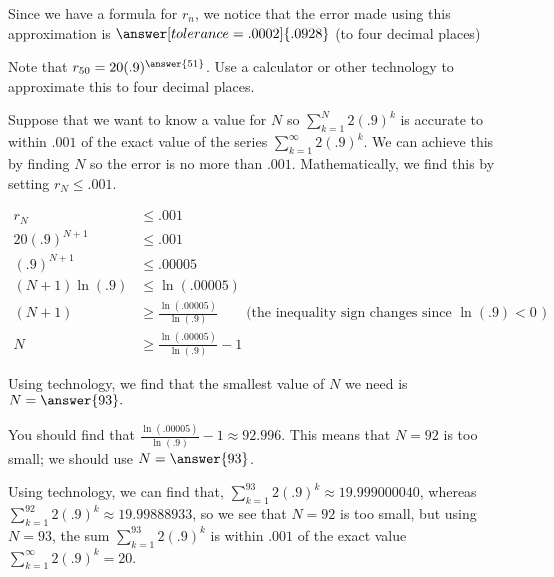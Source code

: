 \documentclass{ximera}
\begin{document}
\begin{exercise}
\begin{exercise}
\begin{exercise}
Since we have a formula for $r_n$, we notice that the error made using this approximation is $\answer[tolerance=.0002]{.0928}$ (to four decimal places)

\begin{hint}
Note that $r_{50} = 20(.9)^{\answer{51}}$.  Use a calculator or other technology to approximate this to four decimal places.
\end{hint}

\end{exercise}
\begin{exercise}
Suppose that we want to know a value for $N$ so $\sum_{k=1}^{N} 2(.9)^k $ is accurate to within $.001$ of the exact value of the series $\sum_{k=1}^{\infty} 2(.9)^k $.  We can achieve this by finding $N$ so the error is no more than $.001$.  Mathematically, we find this by setting $r_N \leq .001$.

\begin{align*}
r_N & \leq .001 \\
20(.9)^{N+1} & \leq .001 \\
(.9)^{N+1} & \leq .00005 \\
(N+1) \ln(.9) &\leq \ln(.00005) \\ 
(N+1) &\geq \frac{\ln(.00005)}{\ln(.9) } \qquad \textrm{(the inequality sign changes since $\ln(.9)<0$ )} \\ 
N &\geq \frac{\ln(.00005)}{\ln(.9) } -1
\end{align*}

Using technology, we find that the smallest value of $N$ we need is $N= \answer{93}.$

\begin{hint}
You should find that $\frac{\ln(.00005)}{\ln(.9) } -1 \approx 92.996$.  This means that $N=92$ is too small; we should use $N=\answer{93}$.
\end{hint}

\begin{feedback}
Using technology, we can find that, $\sum_{k=1}^{93} 2(.9)^k \approx 19.999000040$, whereas $\sum_{k=1}^{92} 2(.9)^k \approx 19.99888933$, so we see that $N=92$ is too small, but using $N=93$, the sum $\sum_{k=1}^{93} 2(.9)^k$ is within $.001$ of the exact value $\sum_{k=1}^{\infty} 2(.9)^k = 20$.
\end{feedback}

\end{exercise}



\end{exercise}

\end{exercise}
\end{document}
